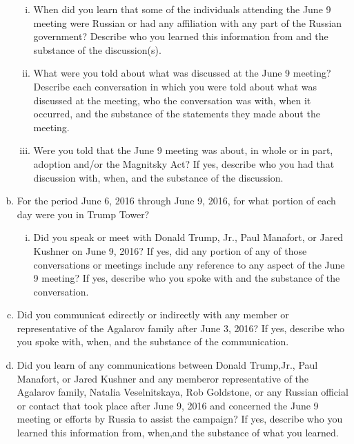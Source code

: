\begin{enumerate}[a.]
\begin{enumerate}[i.]
\item When did you learn that some of the individuals attending the June 9 meeting were Russian or had any affiliation with any part of the Russian government?
Describe who you learned this information from and the substance of the discussion(s).

\item What were you told about what was discussed at the June 9 meeting?
Describe each conversation in which you were told about what was discussed at the meeting, who the conversation was with, when it occurred, and the substance of the statements they made about the meeting.

\item Were you told that the June 9 meeting was about, in whole or in part, adoption and/or the Magnitsky Act?
If yes, describe who you had that discussion with, when, and the substance of the discussion.

\end{enumerate}

\item For the period June 6, 2016 through June 9, 2016, for what portion of each day were you in Trump Tower?

\begin{enumerate}[i.]

\item Did you speak or meet with Donald Trump, Jr., Paul Manafort, or Jared Kushner on June 9, 2016?
If yes, did any portion of any of those conversations or meetings include any reference to any aspect of the June 9 meeting?
If yes, describe who you spoke with and the substance of the conversation.

\end{enumerate}

\item Did you communicat edirectly or indirectly with any member or representative of the Agalarov family after June 3, 2016?
If yes, describe who you spoke with, when, and the substance of the communication.

\item Did you learn of any communications between Donald Trump,Jr., Paul Manafort, or Jared Kushner and any memberor representative of the Agalarov family, Natalia Veselnitskaya, Rob Goldstone, or any Russian official or contact that took place after June 9, 2016 and concerned the June 9 meeting or efforts by Russia to assist the campaign?
If yes, describe who you learned this information from, when,and the substance of what you learned.


\end{enumerate}
